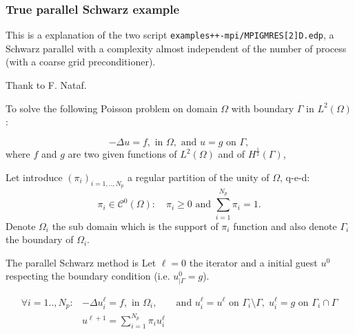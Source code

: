 \documentclass[a4paper,twoside,12pt]{book}
\begin{document}
\subsubsection{True parallel Schwarz example}

This is a explanation of the two script  \texttt{examples++-mpi/MPIGMRES[2]D.edp}, 
a Schwarz parallel with a complexity almost independent of the number of process (with a coarse grid preconditioner).


\hfill Thank to F. Nataf. 

\bigskip 
\def\vh{{v_h}}
\def\uh^#1{{u_h^{#1}}}
\def\Nh{{\mathcal{N}_h}}
\def\Nhg{{\mathcal{N}^\Gamma_h}}
\def\Nhgi_#1{{\mathcal{N}^{\Gamma_i}_{h#1}}}
\def\Th{{\mathcal{T}_h}}
\def\Vh{{V_h}}
\def\VOh{{V_{0h}}}
\newcommand{\1}{\mathrm{1\!\!I}}
To solve the following Poisson problem 
on domain $\Omega$ with boundary $\Gamma$ in $L^2(\Omega)$ :

$$
 -\Delta u = f,  \mbox{ in } \Omega,\mbox{ and } u= g \mbox{ on } \Gamma,
$$
 where $ f$ and $g$ are two given functions of $L^2(\Omega)$ and of $H^{\frac12}(\Gamma)$,



Let introduce   $(\pi_i)_{i=1,.., N_p}$ a regular partition of the unity  of $\Omega$, q-e-d:
$$ \pi_i \in \mathcal{C}^0(\Omega) : \quad  \pi_i\ge 0 \mbox{ and } \sum_{i=1}^{N_p} \pi_i =1 .$$
Denote $ \Omega_i$ the sub domain which is the support of $\pi_i$ function and also denote $\Gamma_i$ the boundary 
of $\Omega_i$.

The parallel Schwarz 	method is 
Let $\ell=0$ the iterator and a initial guest $u^0$  respecting the boundary condition (i.e. 
$u^0_{|\Gamma} = g$). 


\begin{eqnarray}
\label{eq:lapl} \forall i = 1 .., N_p: & \displaystyle   -\Delta u_i^\ell = f, \mbox{ in }	 \Omega_i ,&\mbox{ and } u_i^\ell= u^\ell \mbox{ on }  \Gamma_i \setminus \Gamma,\; u_i^\ell=g \mbox{ on }  \Gamma_i \cap  \Gamma     \\
\label{eq:pu1}&u^{\ell+1} = \sum_{i=1}^{N_p} \pi_i u_i^\ell &   
\end{eqnarray}
\end{document}
